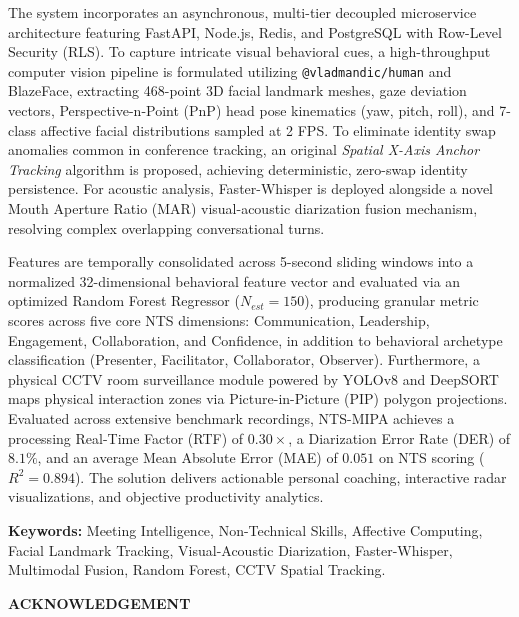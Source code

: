 \documentclass[12pt,a4paper,oneside]{report}
\begin{document}
The system incorporates an asynchronous, multi-tier decoupled microservice architecture featuring FastAPI, Node.js, Redis, and PostgreSQL with Row-Level Security (RLS). To capture intricate visual behavioral cues, a high-throughput computer vision pipeline is formulated utilizing \texttt{@vladmandic/human} and BlazeFace, extracting 468-point 3D facial landmark meshes, gaze deviation vectors, Perspective-n-Point (PnP) head pose kinematics (yaw, pitch, roll), and 7-class affective facial distributions sampled at 2 FPS. To eliminate identity swap anomalies common in conference tracking, an original \textit{Spatial X-Axis Anchor Tracking} algorithm is proposed, achieving deterministic, zero-swap identity persistence. For acoustic analysis, Faster-Whisper is deployed alongside a novel Mouth Aperture Ratio (MAR) visual-acoustic diarization fusion mechanism, resolving complex overlapping conversational turns. 

Features are temporally consolidated across 5-second sliding windows into a normalized 32-dimensional behavioral feature vector and evaluated via an optimized Random Forest Regressor ($N_{est}=150$), producing granular metric scores across five core NTS dimensions: Communication, Leadership, Engagement, Collaboration, and Confidence, in addition to behavioral archetype classification (Presenter, Facilitator, Collaborator, Observer). Furthermore, a physical CCTV room surveillance module powered by YOLOv8 and DeepSORT maps physical interaction zones via Picture-in-Picture (PIP) polygon projections. Evaluated across extensive benchmark recordings, NTS-MIPA achieves a processing Real-Time Factor (RTF) of $0.30\times$, a Diarization Error Rate (DER) of $8.1\%$, and an average Mean Absolute Error (MAE) of $0.051$ on NTS scoring ($R^2 = 0.894$). The solution delivers actionable personal coaching, interactive radar visualizations, and objective productivity analytics.

\vspace{0.8cm}
\noindent\textbf{Keywords:} Meeting Intelligence, Non-Technical Skills, Affective Computing, Facial Landmark Tracking, Visual-Acoustic Diarization, Faster-Whisper, Multimodal Fusion, Random Forest, CCTV Spatial Tracking.

\clearpage
\thispagestyle{plain}
\begin{center}
  {\fontsize{14}{17}\bfseries\MakeUppercase{Acknowledgement}\par}
\end{center}
\vspace{0.6cm}
\end{document}
